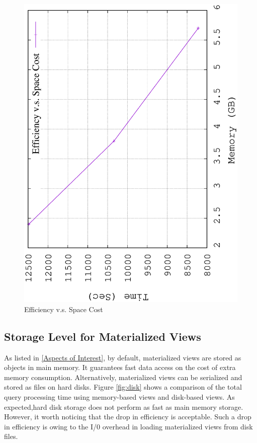 	\begin{figure}[H]
		\centering
		\includegraphics[scale=0.5, angle=270]{plot/limit.eps}
		\caption{Efficiency v.s. Space Cost}
		\label{fig:limit}
	\end{figure}
	
	\subsection{Storage Level for Materialized Views}
	\label{Storage Level for Merialized Views}
	As listed in \ref{Aspects of Interest}, by default, materialized views are stored as objects in main memory. It guarantees fast data access on the cost of extra memory consumption. Alternatively, materialized views can be serialized and stored as files on hard disks. Figure \ref{fig:disk} shows a comparison of the total query processing time using memory-based views and disk-based views. As expected,hard disk storage does not perform as fast as main memory storage. However, it worth noticing that  the drop in efficiency is acceptable. Such a drop in efficiency is owing to the I/0 overhead in loading materialized views from disk files.
	

